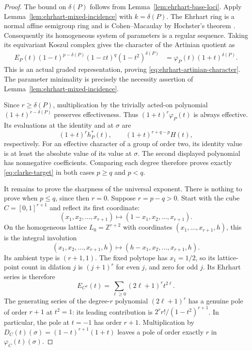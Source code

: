\documentclass[11pt,a4paper]{article}
\theoremstyle{definition}
\theoremstyle{remark}\newtheorem{remark}[lemma]{Remark}
\begin{document}
\begin{proof}
The bound on $\delta(P)$ follows from
Lemma~\ref{lem:ehrhart-base-loci}. Apply
Lemma~\ref{lem:ehrhart-mixed-incidence} with $k=\delta(P)$. The Ehrhart
ring is a normal affine semigroup ring and is Cohen--Macaulay by
Hochster's theorem \cite{Hochster72}. Consequently its homogeneous
system of parameters is a regular sequence. Taking its equivariant
Koszul complex gives the character of the Artinian quotient as
\begin{align*}
 E_P(t)(1-t)^{p-\delta(P)}(1-\varepsilon t)^q
                 (1-t^2)^{\delta(P)}
 &=\varphi_P(t)(1+t)^{\delta(P)}.
\end{align*}
This is an actual graded representation, proving
\eqref{eq:ehrhart-artinian-character}. The parameter minimality is
precisely the necessity assertion of
Lemma~\ref{lem:ehrhart-mixed-incidence}.

Since $r\geq\delta(P)$, multiplication by the trivially acted-on
polynomial $(1+t)^{r-\delta(P)}$ preserves effectiveness. Thus
$(1+t)^r\varphi_P(t)$ is always effective. Its evaluations at the
identity and at $\sigma$ are
\[
 (1+t)^r h^*_P(t),\qquad (1+t)^{r+q-p}H(t),
\]
respectively. For an effective character of a group of order two, its
identity value is at least the absolute value of its value at $\sigma$.
The second displayed polynomial has nonnegative coefficients. Comparing
each degree therefore proves exactly \eqref{eq:clarke-target} in both
cases $p\geq q$ and $p<q$.

It remains to prove the sharpness of the universal exponent. There is
nothing to prove when $p\leq q$, since then $r=0$. Suppose $r=p-q>0$.
Start with the cube $C=[0,1]^{r+1}$ and reflect its first coordinate:
\[
 (x_1,x_2,\ldots,x_{r+1})\longmapsto
       (1-x_1,x_2,\ldots,x_{r+1}).
\]
On the homogeneous lattice $L_0=\mathbb Z^{r+2}$ with coordinates
$(x_1,\ldots,x_{r+1},h)$, this is the integral involution
\[
 (x_1,x_2,\ldots,x_{r+1},h)\longmapsto
       (h-x_1,x_2,\ldots,x_{r+1},h).
\]
Its ambient type is $(r+1,1)$. The fixed polytope has $x_1=1/2$, so its
lattice-point count in dilation $j$ is $(j+1)^r$ for even $j$, and zero
for odd $j$. Its Ehrhart series is therefore
\[
 E_{C^\sigma}(t)=\sum_{\ell\geq0}(2\ell+1)^r t^{2\ell}.
\]
The generating series of the degree-$r$ polynomial $(2\ell+1)^r$ has a
genuine pole of order $r+1$ at $t^2=1$: its leading contribution is
$2^r r!/(1-t^2)^{r+1}$. In particular, the pole at $t=-1$ has order
$r+1$. Multiplication by
$D_C(t)(\sigma)=(1-t)^{r+1}(1+t)$ leaves a pole of order exactly $r$ in
$\varphi_C(t)(\sigma)$.


\end{proof}
\end{document}
